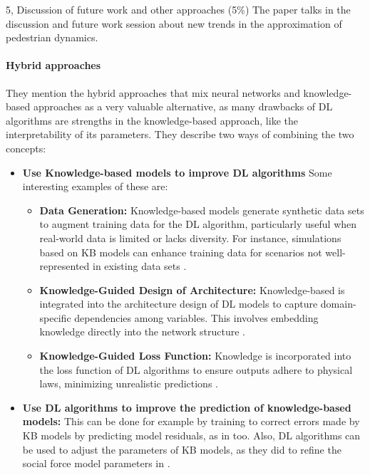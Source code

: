 \begin{task}{5, Discussion of future work and other approaches (5\%)}
The paper \cite{korbmacher2022review} talks in the discussion and future work session about new trends in the approximation of pedestrian dynamics. 

\paragraph{Hybrid approaches} They mention the hybrid approaches that mix neural networks and knowledge-based approaches as a very valuable alternative, as many drawbacks of DL algorithms are strengths in the knowledge-based approach, like the interpretability of its parameters. They describe two ways of combining the two concepts:
\begin{itemize}
    \item \textbf{Use Knowledge-based models to improve DL algorithms} Some interesting examples of these are:
    \begin{itemize}
    \item \textbf{Data Generation:} Knowledge-based models generate synthetic data sets to augment training data for the DL algorithm, particularly useful when real-world data is limited or lacks diversity. For instance, simulations based on KB models can enhance training data for scenarios not well-represented in existing data sets \cite{von2020combining}.
    \item \textbf{Knowledge-Guided Design of Architecture: }Knowledge-based is integrated into the architecture design of DL models to capture domain-specific dependencies among variables. This involves embedding knowledge directly into the network structure \cite{antonucci2020generating}.
    \item \textbf{Knowledge-Guided Loss Function:}  Knowledge is incorporated into the loss function of DL algorithms to ensure outputs adhere to physical laws, minimizing unrealistic predictions \cite{willard2022integrating}. 
    \end{itemize}
    \item \textbf{Use DL algorithms to improve the prediction of knowledge-based models:} This can be done for example by training to correct errors made by KB models by predicting model residuals, as in \cite{willard2022integrating} too. Also, DL algorithms can be used to adjust the parameters of KB models, as they did to refine the social force model parameters in \cite{gottlich2020artificial}. 
\end{itemize}


\end{task}
